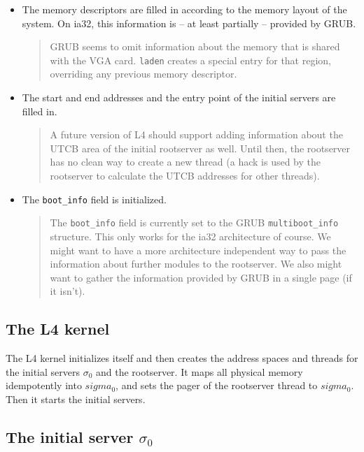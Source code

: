 \documentclass[9pt,a4paper]{extarticle}
\newenvironment{comment}{\footnotesize \begin{quote}}{\end{quote}}
\begin{document}
\begin{itemize}
\item The memory descriptors are filled in according to the memory
  layout of the system.  On ia32, this information is -- at least
  partially -- provided by GRUB.

  \begin{comment}
    GRUB seems to omit information about the memory that is shared
    with the VGA card.  \texttt{laden} creates a special entry for
    that region, overriding any previous memory descriptor.
  \end{comment}
  
\item The start and end addresses and the entry point of the initial
  servers are filled in.

  \begin{comment}
    A future version of L4 should support adding information about the
    UTCB area of the initial rootserver as well.  Until then, the
    rootserver has no clean way to create a new thread (a hack is used
    by the rootserver to calculate the UTCB addresses for other
    threads).
  \end{comment}

\item The \verb/boot_info/ field is initialized.

  \begin{comment}
    The \verb/boot_info/ field is currently set to the GRUB
    \verb/multiboot_info/ structure.  This only works for the ia32
    architecture of course.  We might want to have a more architecture
    independent way to pass the information about further modules to
    the rootserver.  We also might want to gather the information
    provided by GRUB in a single page (if it isn't).
  \end{comment}
\end{itemize}


\subsection{The L4 kernel}

The L4 kernel initializes itself and then creates the address spaces
and threads for the initial servers $\sigma_0$ and the rootserver.  It
maps all physical memory idempotently into $sigma_0$, and sets the
pager of the rootserver thread to $sigma_0$.  Then it starts the
initial servers.


\subsection{The initial server $\sigma_0$}
\end{document}
